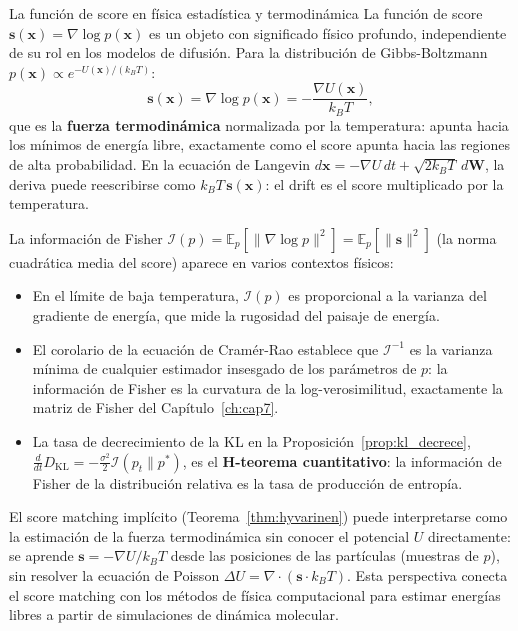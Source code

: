 \begin{fisicaconexion}{La función de score en física estadística y termodinámica}
La función de score $\bm{s}(\bm{x}) = \nabla\log p(\bm{x})$ es un objeto con
significado físico profundo, independiente de su rol en los modelos de difusión.
Para la distribución de Gibbs-Boltzmann $p(\bm{x}) \propto e^{-U(\bm{x})/(k_BT)}$:
\[
  \bm{s}(\bm{x}) = \nabla\log p(\bm{x}) = -\frac{\nabla U(\bm{x})}{k_BT},
\]
que es la \textbf{fuerza termodinámica} normalizada por la temperatura: apunta
hacia los mínimos de energía libre, exactamente como el score apunta hacia las
regiones de alta probabilidad. En la ecuación de Langevin $d\bm{x} = -\nabla U\,dt
+ \sqrt{2k_BT}\,d\bm{W}$, la deriva puede reescribirse como $k_BT\,\bm{s}(\bm{x})$:
el drift es el score multiplicado por la temperatura.

La información de Fisher $\mathcal{I}(p) = \mathbb{E}_p[\|\nabla\log p\|^2]
= \mathbb{E}_p[\|\bm{s}\|^2]$ (la norma cuadrática media del score) aparece
en varios contextos físicos:
\begin{itemize}
  \item En el límite de baja temperatura, $\mathcal{I}(p)$ es proporcional a
        la varianza del gradiente de energía, que mide la rugosidad del paisaje
        de energía.
  \item El corolario de la ecuación de Cramér-Rao establece que $\mathcal{I}^{-1}$
        es la varianza mínima de cualquier estimador insesgado de los parámetros
        de $p$: la información de Fisher es la curvatura de la log-verosimilitud,
        exactamente la matriz de Fisher del Capítulo~\ref{ch:cap7}.
  \item La tasa de decrecimiento de la KL en la Proposición~\ref{prop:kl_decrece},
        $\frac{d}{dt}D_\mathrm{KL} = -\frac{\sigma^2}{2}\mathcal{I}(p_t\|p^*)$,
        es el \textbf{H-teorema cuantitativo}: la información de Fisher de la
        distribución relativa es la tasa de producción de entropía.
\end{itemize}

El score matching implícito (Teorema~\ref{thm:hyvarinen}) puede interpretarse
como la estimación de la fuerza termodinámica sin conocer el potencial $U$
directamente: se aprende $\bm{s} = -\nabla U / k_BT$ desde las posiciones de
las partículas (muestras de $p$), sin resolver la ecuación de Poisson $\Delta U
= \nabla\cdot(\bm{s}\cdot k_BT)$. Esta perspectiva conecta el score matching
con los métodos de física computacional para estimar energías libres a partir
de simulaciones de dinámica molecular.
\end{fisicaconexion}

